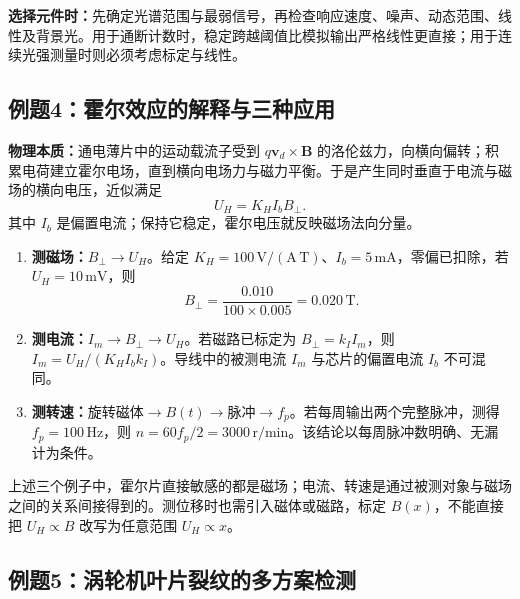 \textbf{选择元件时：}先确定光谱范围与最弱信号，再检查响应速度、噪声、动态范围、线性及背景光。用于通断计数时，稳定跨越阈值比模拟输出严格线性更直接；用于连续光强测量时则必须考虑标定与线性。

\Needspace{8cm}
\subsection{例题4：霍尔效应的解释与三种应用}


\sol
\textbf{物理本质：}通电薄片中的运动载流子受到 $q\mathbf v_d\times\mathbf B$ 的洛伦兹力，向横向偏转；积累电荷建立霍尔电场，直到横向电场力与磁力平衡。于是产生同时垂直于电流与磁场的横向电压，近似满足
\[
U_H=K_HI_bB_\perp.
\]
其中 $I_b$ 是偏置电流；保持它稳定，霍尔电压就反映磁场法向分量。

\begin{enumerate}
\item \textbf{测磁场：}$B_\perp\to U_H$。给定 $K_H=100\,\mathrm{V/(A\,T)}$、$I_b=5\,\mathrm{mA}$，零偏已扣除，若 $U_H=10\,\mathrm{mV}$，则
\[
B_\perp=\frac{0.010}{100\times0.005}=0.020\,\mathrm T.
\]
\item \textbf{测电流：}$I_m\to B_\perp\to U_H$。若磁路已标定为 $B_\perp=k_I I_m$，则 $I_m=U_H/(K_HI_bk_I)$。导线中的被测电流 $I_m$ 与芯片的偏置电流 $I_b$ 不可混同。
\item \textbf{测转速：}$\text{旋转磁体}\to B(t)\to\text{脉冲}\to f_p$。若每周输出两个完整脉冲，测得 $f_p=100\,\mathrm{Hz}$，则 $n=60f_p/2=3000\,\mathrm{r/min}$。该结论以每周脉冲数明确、无漏计为条件。
\end{enumerate}
上述三个例子中，霍尔片直接敏感的都是磁场；电流、转速是通过被测对象与磁场之间的关系间接得到的。测位移时也需引入磁体或磁路，标定 $B(x)$，不能直接把 $U_H\propto B$ 改写为任意范围 $U_H\propto x$。


\Needspace{8cm}
\subsection{例题5：涡轮机叶片裂纹的多方案检测}


